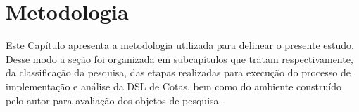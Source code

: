 \chapter{Metodologia}
\label{metodologia}

Este Capítulo apresenta a metodologia utilizada para delinear o presente estudo. Desse modo a seção foi organizada em subcapítulos que tratam respectivamente, da classificação da pesquisa, das etapas realizadas para execução do processo de implementação e análise da DSL de Cotas, bem como do ambiente construído pelo autor para avaliação dos objetos de pesquisa.





 
 

 
 